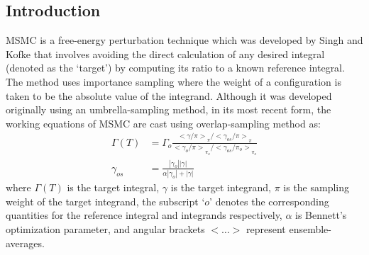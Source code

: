     \subsection{Introduction}
    \label{subsec:MSMCintro}
    MSMC is a free-energy perturbation technique which was developed by Singh and Kofke \cite{Singh2004} that involves avoiding the direct calculation of any desired integral (denoted as the `target') by computing its ratio to a known reference integral. The method uses importance sampling where the weight of a configuration is taken to be the absolute value of the integrand. Although it was developed originally using an umbrella-sampling \cite{Singh2004,Frenkel,Schultz2009} method, in its most recent form, the working equations of MSMC are cast using overlap-sampling method as:
    \begin{equation}
        \label{eq:MSMCworking}
        \begin{aligned}
            \Gamma (T) &= \Gamma_o \frac{{<\gamma/\pi>}_\pi / {<\gamma_{os}/\pi>}_\pi}{{<\gamma_o/\pi>}_{\pi_o} / {<\gamma_{os}/\pi_o>}_{\pi_o}}\\
            \gamma_{os} &= \frac{|\gamma_o||\gamma|}{\alpha |\gamma_o| + |\gamma|}
        \end{aligned}
    \end{equation}
    where $\Gamma (T)$ is the target integral, $\gamma$ is the target integrand, $\pi$ is the sampling weight of the target integrand, the subscript `$o$' denotes the corresponding quantities for the reference integral and integrands respectively, $\alpha$ is Bennett's \cite{Bennett1976} optimization parameter, and angular brackets $<\ldots>$ represent ensemble-averages.

